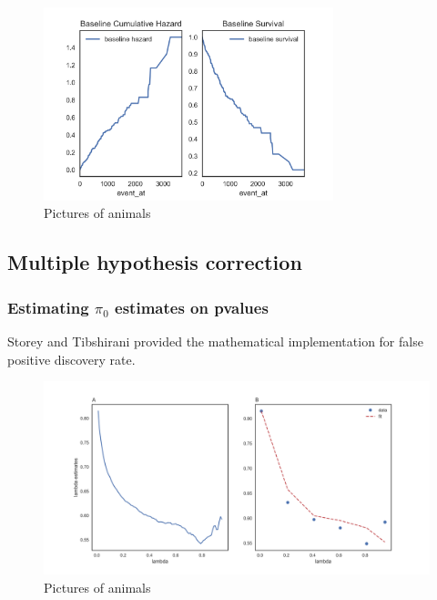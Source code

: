 \documentclass[11pt]{article}
\begin{document}
\begin{figure}[bh]
    \centering
      \includegraphics[width=0.75\textwidth]{survial_plot_one_mock_gene.png}
    \caption{Pictures of animals}
    \label{fig:Baseline_hazard_and_survival}
\end{figure}
  	
	
	
	\subsection { Multiple hypothesis correction }
	
	\subsubsection {Estimating $\pi_0$ estimates on pvalues}
	
	Storey and Tibshirani \cite{storey2003statistical} provided the mathematical implementation for false positive discovery rate. 


\begin{figure}[bh]
    \centering
      \includegraphics[width=\textwidth]{lambdaestimatescurvefitting.png}
    \caption{Pictures of animals}\label{fig:animals}
\end{figure}
\end{document}
